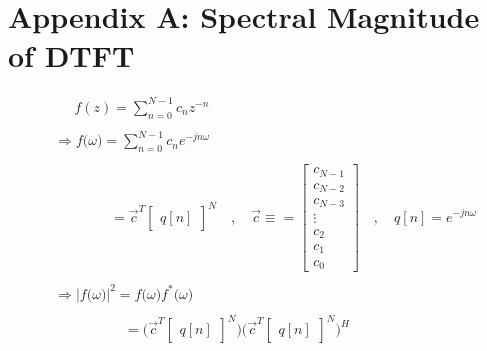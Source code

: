 \documentclass{article}
\begin{document}
\section*{Appendix A: Spectral Magnitude of DTFT}

\begin{align*}
    &\quad \ \ f(z) = \sum_{n = 0}^{N - 1}c_{n}z^{-n} \\ \\
    &\Rightarrow f\big(\omega\big) = \sum_{n = 0}^{N - 1}c_{n}e^{-jn\omega} \\ \\
    &\quad \quad \quad \quad = \vec{c}^{T}\begin{bmatrix} q[n] \end{bmatrix}^{N} \quad, \quad \vec{c} \equiv = \begin{bmatrix}
                                                                                                                    c_{N - 1} \\
                                                                                                                    c_{N - 2} \\
                                                                                                                    c_{N - 3} \\
                                                                                                                       \vdots \\
                                                                                                                    c_{    2} \\
                                                                                                                    c_{    1} \\
                                                                                                                    c_{    0}
                                                                                                                 \end{bmatrix} \quad, \quad q[n] = e^{-jn\omega} \\ \\
    &\Rightarrow \Big|f\big(\omega\big)\Big|^{2} = f\big(\omega\big)f^{*}\big(\omega\big) \\ \\
    &\quad \quad \quad \quad \quad = \bigg(\vec{c}^{T}\begin{bmatrix} q[n] \end{bmatrix}^{N}\bigg)\bigg(\vec{c}^{T}\begin{bmatrix} q[n] \end{bmatrix}^{N}\bigg)^{H} \\ \\

\end{align*}
\end{document}
